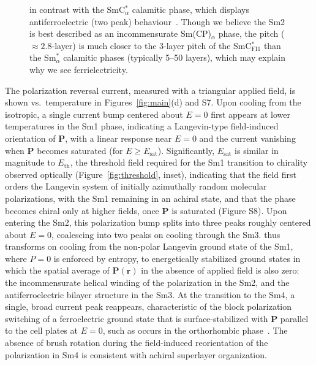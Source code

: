 \begin{figure}[h!]
{                                            in contrast with the
                                            SmC$^{*}_\alpha$ calamitic phase,
                                            which displays
                                            antiferroelectric (two peak)
                                            behaviour~\cite{lagerwall2005demonstration}.
                                            Though we believe the Sm2 is best
                                            described as an incommensurate
                                            Sm(CP)$_\alpha$ phase, the pitch
                                            ($\approx 2.8$-layer) is much closer
                                            to the $3$-layer
                                            pitch of the SmC$^{*}_\textrm{FI1}$
                                            than the Sm$^{*}_\alpha$ calamitic
                                            phases
                                            (typically 5--50 layers),
                                            which may explain why we see
                                        ferrielectricity.} 
\end{figure}
The polarization reversal current, measured with a triangular
applied field, is shown vs.\ temperature in Figures~\ref{fig:main}(d) and
S7. Upon cooling from the isotropic, a single current bump centered
about $E=0$ first appears at lower temperatures in the Sm1 phase, indicating a Langevin-type
field-induced orientation of $\mathbf{P}$, with a linear response near $E=0$
and the current vanishing  when $\mathbf{P}$ becomes saturated (for $E \ge E_\text{sat}$).
Significantly, $E_\text{sat}$ is similar in magnitude to $E_\text{th}$, the threshold
field required for the Sm1
transition to chirality observed optically (Figure~\ref{fig:threshold}, inset), indicating that the
field first orders the Langevin system of initially azimuthally random molecular
polarizations, with the Sm1 remaining in an achiral state, and that the phase becomes
chiral only at higher fields, once $\mathbf{P}$ is saturated (Figure S8). Upon entering the
Sm2, this polarization bump splits into three peaks roughly centered about
$E=0$, coalescing into two peaks on cooling through the Sm3.
 thus transforms on cooling from the non-polar
Langevin ground state of the Sm1, where $P=0$ is enforced by entropy, to energetically stabilized ground
states in which the spatial average of
$\mathbf{P}(\mathbf{r})$ in the absence of applied field is also zero: the incommensurate helical winding of the
polarization
in the Sm2, and the antiferroelectric bilayer structure in the Sm3. At the
transition to the Sm4, a single, broad current peak reappears, characteristic of the block
polarization switching of a ferroelectric ground state that is surface-stabilized
with $\mathbf{P}$ parallel to the cell plates at $E=0$, such as occurs in the orthorhombic  phase~\cite{shen2011effective}.
The absence of brush rotation during the field-induced reorientation of the
polarization in Sm4 is consistent with achiral  superlayer organization.

